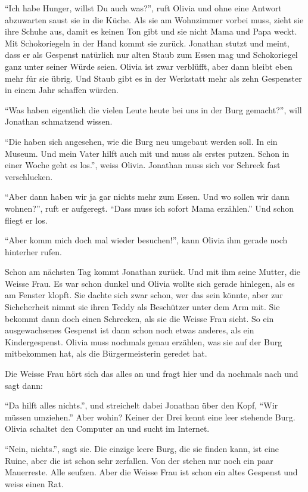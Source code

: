 \enquote{Ich habe Hunger, willst Du auch was?}, ruft Olivia und ohne eine
Antwort abzuwarten saust sie in die Küche. Als sie am Wohnzimmer vorbei muss,
zieht sie ihre Schuhe aus, damit es keinen Ton gibt und sie nicht Mama und Papa
weckt. Mit Schokoriegeln in der Hand kommt sie zurück. Jonathan stutzt und meint, dass er als Gespenst natürlich nur alten Staub zum Essen mag und Schokoriegel ganz unter seiner Würde seien. Olivia ist zwar verblüfft, aber dann bleibt eben mehr für sie übrig. Und Staub gibt es in der Werkstatt mehr als zehn Gespenster in einem Jahr schaffen würden.

\enquote{Was haben eigentlich die vielen Leute heute bei uns in der Burg gemacht?}, will Jonathan schmatzend wissen.

\enquote{Die haben sich angesehen, wie die Burg neu umgebaut werden soll. In ein Museum. Und mein Vater hilft auch mit und muss als erstes putzen. Schon in einer Woche geht es los.}, weiss Olivia. Jonathan muss sich vor Schreck fast verschlucken.

\enquote{Aber dann haben wir ja gar nichts mehr zum Essen. Und wo sollen wir dann wohnen?}, ruft er aufgeregt. \enquote{Dass muss ich sofort Mama erzählen.} Und schon fliegt er los.

\enquote{Aber komm mich doch mal wieder besuchen!}, kann Olivia ihm gerade noch hinterher rufen.

Schon am nächsten Tag kommt Jonathan zurück. Und mit ihm seine Mutter, die Weisse Frau. Es war schon dunkel und Olivia wollte sich gerade hinlegen, als es am Fenster klopft. Sie dachte sich zwar schon, wer das sein könnte, aber zur Sicheherheit nimmt sie ihren Teddy als Beschützer unter dem Arm mit. Sie bekommt dann doch einen Schrecken, als sie die Weisse Frau sieht. So ein ausgewachsenes Gespenst ist dann schon noch etwas anderes, als ein Kindergespenst. Olivia muss nochmals genau erzählen, was sie auf der Burg mitbekommen hat, als die Bürgermeisterin geredet hat.

Die Weisse Frau hört sich das alles an und fragt hier und da nochmals nach und sagt dann: 

\enquote{Da hilft alles nichts.}, und streichelt dabei Jonathan über den Kopf, \enquote{Wir müssen umziehen.} Aber wohin? Keiner der Drei kennt eine leer stehende Burg. Olivia schaltet den Computer an und sucht im Internet.

\enquote{Nein, nichts.}, sagt sie. Die einzige leere Burg, die sie finden kann, ist eine Ruine, aber die ist schon sehr zerfallen. Von der stehen nur noch ein paar Mauerreste. Alle seufzen. Aber die Weisse Frau ist schon ein altes Gespenst und weiss einen Rat.

